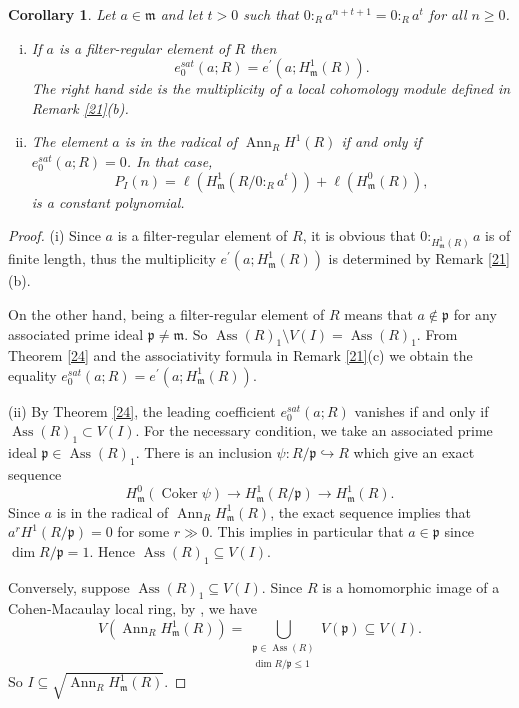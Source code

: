 \documentclass{amsart}
\newtheorem {corollary}[theorem]{Corollary}
\theoremstyle {definition}
\theoremstyle {remark}
\begin{document}
\begin{corollary}\label{25}
Let $a\in {\ensuremath{\mathfrak m}}$ and let $t>0$ such that $0:_Ra^{n+t+1}=0:_Ra^t$ for all $n\geq 0$.
\begin{enumerate}[(i)]
\item If $a$ is a filter-regular element of $R$ then
$$e_0^{sat}(a; R)=e^\prime(a; H^1_{\ensuremath{\mathfrak m}}(R)).$$
The right hand side is the multiplicity of a local cohomology module defined in Remark \ref{21}(b).

\item The element $a$ is in the radical of ${\operatorname{Ann}}_RH^1(R)$ if and only if $e_0^{sat}(a; R)=0$. In that case,
$$P_I(n)=\ell(H^1_{\ensuremath{\mathfrak m}}(R/0:_Ra^t))+\ell(H^0_{\ensuremath{\mathfrak m}}(R)),$$
is a constant polynomial.
\end{enumerate}
\end{corollary}
\begin{proof}
\item(i) Since $a$ is a filter-regular element of $R$, it is obvious that $0:_{H^1_{\ensuremath{\mathfrak m}}(R)}a$ is of finite length, thus the multiplicity $e^\prime(a; H^1_{\ensuremath{\mathfrak m}}(R))$ is determined by Remark \ref{21}(b).

On the other hand, being a filter-regular element of $R$ means that $a\not\in{\ensuremath{\mathfrak p}}$ for any associated prime ideal ${\ensuremath{\mathfrak p}}\not={\ensuremath{\mathfrak m}}$. So ${\operatorname{Ass}}(R)_1\setminus V(I)={\operatorname{Ass}}(R)_1$. From Theorem \ref{24} and the associativity formula in Remark \ref{21}(c) we obtain the equality $e_0^{sat}(a; R)=e^\prime(a; H^1_{\ensuremath{\mathfrak m}}(R))$.

\item(ii) By Theorem \ref{24}, the leading coefficient $e_0^{sat}(a; R)$ vanishes if and only if ${\operatorname{Ass}}(R)_1\subset V(I)$. For the necessary condition, we take an associated prime ideal ${\ensuremath{\mathfrak p}}\in {\operatorname{Ass}}(R)_1$. There is an inclusion $\psi: R/{\ensuremath{\mathfrak p}}\hookrightarrow R$ which give an exact sequence
$$H^0_{\ensuremath{\mathfrak m}}({\operatorname{Coker}} \psi)\rightarrow H^1_{\ensuremath{\mathfrak m}}(R/{\ensuremath{\mathfrak p}})\rightarrow H^1_{\ensuremath{\mathfrak m}}(R).$$
Since $a$ is in the radical of ${\operatorname{Ann}}_RH^1_{\ensuremath{\mathfrak m}}(R)$, the exact sequence implies that $a^rH^1(R/{\ensuremath{\mathfrak p}})=0$ for some $r\gg0$. This implies in particular that $a\in {\ensuremath{\mathfrak p}}$ since $\dim R/{\ensuremath{\mathfrak p}}=1$. Hence ${\operatorname{Ass}}(R)_1\subseteq V(I)$.

Conversely, suppose ${\operatorname{Ass}}(R)_1\subseteq V(I)$. Since $R$ is a homomorphic image of a Cohen-Macaulay local ring, by \cite[Proposition 2.5]{BS1}, we have $$V({\operatorname{Ann}}_RH^1_{\ensuremath{\mathfrak m}}(R))=\bigcup_{\substack{{\ensuremath{\mathfrak p}}\in {\operatorname{Ass}}(R)\\ \dim R/{\ensuremath{\mathfrak p}}\leq 1}} V({\ensuremath{\mathfrak p}})\subseteq V(I).$$
So $I\subseteq \sqrt{{\operatorname{Ann}}_RH^1_{\ensuremath{\mathfrak m}}(R)}$.
\end{proof}
\end{document}
